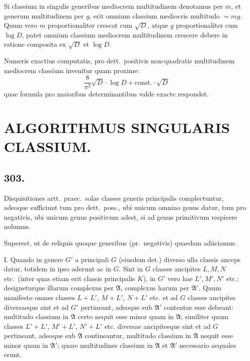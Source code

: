 \documentclass[12pt,a4paper]{article}
\theoremstyle{plain}
\theoremstyle{definition}
\theoremstyle{remark}
\begin{document}
Si classium in singulis generibus mediocrem multitudinem denotamus per
$m$, et generum multitudinem per $g$, erit omnium classium mediocris multitudo
$= mg$. Quum vero $m$ proportionaliter crescat cum $\sqrt{D}$, atque $g$ proportionaliter
cum $\log D$, patet omnium classium mediocrem multitudinem crescere debere in
ratione composita ex $\sqrt{D}$ et $\log D$.

Numeris exactius computatis, pro dett.\ positivis non-quadratis multitudinem
mediocrem classium invenitur quam proxime:
\[
\frac{8}{\pi^2}\sqrt{D} \cdot \log D + \text{const.} \cdot \sqrt{D}
\]
quae formula pro maioribus determinantibus valde exacte respondet.

\newpage
{}
\section*{ALGORITHMUS SINGULARIS CLASSIUM.}


\subsection*{303.}

Disquisitiones artt.\ praec.\ solas classes generis principalis complectuntur, adeoque
sufficiunt tum pro dett.\ poss., ubi unicum omnino genus datur, tum pro negativis,
ubi unicum genus positivum adest, si ad genus primitivum respicere nolumus.

Superest, ut de reliquis quoque generibus (pr.\ negativis) quaedam adiiciamus.

\textsc{I.} Quando in genere $G'$ a principali $G$ (eiusdem det.) diverso ulla classis
anceps datur, totidem in ipso aderunt ac in $G$. Sint in $G$ classes ancipites
$L, M, N$ etc.\ (inter quas etiam erit classis principalis $K$), in $G'$ vero hae
$L', M', N'$ etc.; designeturque illarum complexus per $\mathfrak{A}$, complexus harum
per $\mathfrak{A}'$. Quum manifesto omnes classes $L+L'$, $M+L'$, $N+L'$ etc.
et ad $G$ classes ancipites diversaeque sint et ad $G'$ pertineant, adeoque sub
$\mathfrak{A}'$ contentae esse debeant: multitudo classium in $\mathfrak{A}$ certo nequit esse
minor quam in $\mathfrak{A}$; similiter quum classes $L'+L'$, $M'+L'$, $N'+L'$ etc.
diversae ancipitesque sint et ad $G$ pertineant, adeoque sub $\mathfrak{A}$ contineantur,
multitudo classium in $\mathfrak{A}$ nequit esse minor quam in $\mathfrak{A}'$; quare multitudines
classium in $\mathfrak{A}$ et $\mathfrak{A}'$ necessario aequales erunt.
\end{document}
